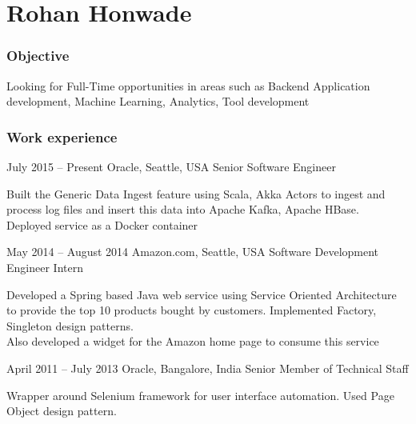 \documentclass{tccv}
\begin{document}
\part{Rohan Honwade}


\section{Objective}
Looking for Full-Time opportunities in areas such as 
Backend Application development, Machine Learning, Analytics, Tool development

\section{Work experience}
\begin{eventlist}
\item{July 2015 -- Present}
     {Oracle, Seattle, USA}
     {Senior Software Engineer}
     
Built the Generic Data Ingest feature using Scala, Akka Actors to ingest and process log files and insert this data into Apache Kafka, Apache HBase.\\ 

Deployed service as a Docker container\\ 

\item{May 2014 -- August 2014}
     {Amazon.com, Seattle, USA}
     {Software Development Engineer Intern}

Developed a Spring based Java web service using Service Oriented Architecture to provide the top 10 products bought by customers. Implemented Factory, Singleton design patterns.\\

Also developed a widget for the Amazon home page to consume this service


\item{April 2011 -- July 2013}
     {Oracle, Bangalore, India}
     {Senior Member of Technical Staff}

Wrapper around Selenium framework for user interface automation. Used Page Object design pattern.\\
\\


\end{eventlist}
\end{document}
